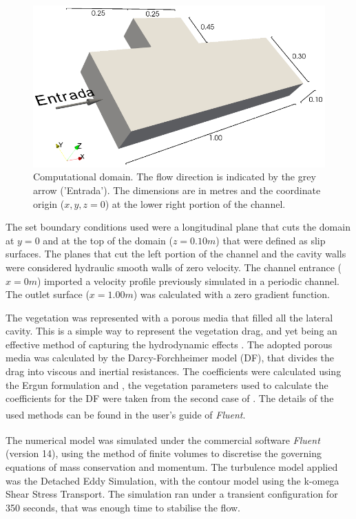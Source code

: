 \begin{figure}[!ht]
\centering
\includegraphics[width=\linewidth]{../images/art2/imgHyd1.png}
\caption{Computational domain. The flow direction is indicated by the grey arrow ('Entrada'). The dimensions are in metres and the coordinate origin ($x, y, z = 0$) at the lower right portion of the channel.}
\label{fig:art2:compDomain}
\end{figure}
The set boundary conditions used were a longitudinal plane that cuts the domain at $y=0$ and at the top of the domain ($z=0.10m$) that were defined as slip surfaces. The planes that cut the left portion of the channel and the cavity walls were considered hydraulic smooth walls of zero velocity. The channel entrance ($x=0m$) imported a velocity profile previously simulated in a periodic channel. The outlet surface ($x=1.00m$) was calculated with a zero gradient function.

The vegetation was represented with a porous media that filled all the lateral cavity. This is a simple way to represent the vegetation drag, and yet being an effective method of capturing the hydrodynamic effects \cite{Yamasaki2019}.  The adopted porous media was calculated by the Darcy-Forchheimer model (DF), that divides the drag into viscous and inertial resistances. The coefficients were calculated using the Ergun formulation and \textcite{Sonnenwald2017}, the vegetation parameters used to calculate the coefficients for the DF were taken from the second case of \textcite{xiang2019}. The details of the used methods can be found in the user's guide of \textit{Fluent}\textsuperscript{\textregistered}.

The numerical model was simulated under the commercial software \textit{Fluent}\textsuperscript{\textregistered} (version 14), using the method of finite volumes to discretise the governing equations of mass conservation and momentum. The turbulence model applied was the Detached Eddy Simulation, with the contour model using the k-omega Shear Stress Transport. The simulation ran under a transient configuration for 350 seconds, that was enough time to stabilise the flow.
